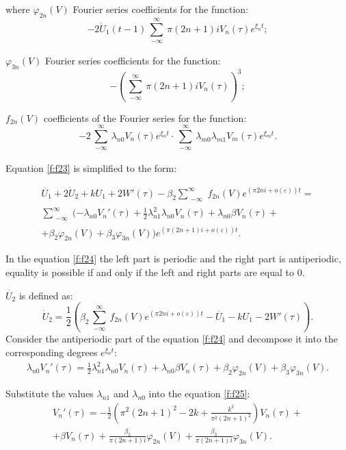 \documentclass[12pt]{article} %
\newcommand{\eps}{\varepsilon}
\begin{document}
\noindent where \(\varphi_{2n}(V)\) Fourier series coefficients for the function:
\[
-2\dot{U}_1(t-1)\sum\limits_{\substack{ -\infty }}^\infty\pi(2n+1)i V_n(\tau)e^{\xi_nt};
\]

\noindent \(\varphi_{3n}(V)\) Fourier series coefficients for the function:
\[
-\left(\sum\limits_{\substack{ -\infty }}^\infty\pi(2n+1)i V_n(\tau)\right)^3;
\]

\noindent\(f_{2n}(V)\) coefficients of the Fourier series for the function:
\[
-2\sum\limits_{\substack{ -\infty }}^\infty\lambda_{n0} V_n(\tau)e^{\xi_nt}\cdot\sum\limits_{\substack{ -\infty }}^\infty\lambda_{m0}\lambda_{m1}V_m(\tau) e^{\xi_mt}.
\]

Equation \eqref{f:f23} is simplified to the form:

\begin{equation}
\begin{array}{cc}
\ddot{U_1}+2\dot{U}_2+kU_1+2W'(\tau)-\beta_2\sum\limits_{\substack{ -\infty }}^\infty f_{2n}(V)e^{(\pi2ni+o(\eps))t}=\\
\sum\limits_{\substack{ -\infty }}^\infty(-\lambda_{n0}V_n'(\tau)+\displaystyle\frac{1}{2}\lambda_{n1}^2\lambda_{n0}V_n(\tau)+\lambda_{n0}\beta V_n(\tau)+\\
+\beta_2\varphi_{2n}(V)+\beta_3\varphi_{3n}(V))e^{(\pi(2n+1)i+o(\eps))t}.
\end{array}
\label{f:f24}
\end{equation}

In the equation \eqref{f:f24} the left part is periodic and the right part is antiperiodic, equality is possible if and only if the left and right parts are equal to 0.

\(\dot{U_2}\) is defined as:
\[
\dot{U}_2=\frac{1}{2}(\beta_2\sum\limits_{\substack{ -\infty }}^\infty f_{2n}(V)e^{(\pi2ni+o(\eps))t}-\ddot{U_1}-kU_1-2W'(\tau)).
\]
Consider the antiperiodic part of the equation \eqref{f:f24} and decompose it into the corresponding degrees \(e^{\xi_nt}\):
\begin{equation}
\begin{array}{cc}
\lambda_{n0}V_n'(\tau)=\displaystyle\frac{1}{2}\lambda_{n1}^2\lambda_{n0}V_n(\tau)+\lambda_{n0}\beta V_n(\tau)+\beta_2\varphi_{2n}(V)+\beta_3\varphi_{3n}(V).
\end{array}
\label{f:f25}
\end{equation}

Substitute the values \(\lambda_{n1}\) and \(\lambda_{n0}\) into the equation \eqref{f:f25}:
\begin{equation}
\begin{array}{cc}
V_n'(\tau)=-\displaystyle\frac{1}{2}\left(\pi^2 (2n+1)^2-2k+\frac{k^2}{\pi^2(2n+1)^2}\right)V_n(\tau)+\\
+\beta V_n(\tau)+\displaystyle\frac{\beta_2}{\pi (2n+1)i}\varphi_{2n}(V)+\displaystyle\frac{\beta_3}{\pi (2n+1)i}\varphi_{3n}(V).
\end{array}
\label{f:f26}
\end{equation}
\end{document}
